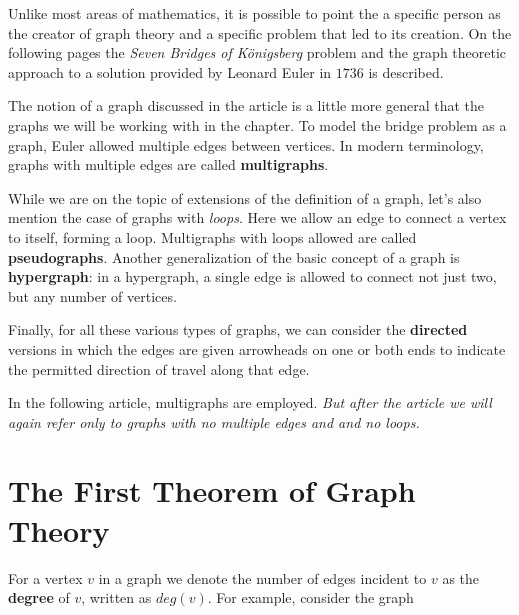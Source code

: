 Unlike most areas of mathematics, it is possible to point the a specific person as the creator of graph theory and a specific problem that  led to its creation. On the following pages  the {\it Seven Bridges of K\"onigsberg} problem  and the graph theoretic approach to a solution provided by Leonard Euler in $1736$ is described. 

The notion of a graph discussed in the article is a little more general that the graphs we will be working with in the chapter. To model the bridge problem as a graph, Euler allowed multiple edges between vertices. In modern terminology, graphs with multiple edges are called {\bfseries multigraphs}.   

While we are on the topic of extensions of the definition of a graph, let's also mention the 
case of graphs with {\it loops}. Here we allow an edge to connect a vertex to itself, forming a 
loop. Multigraphs with loops allowed are called {\bfseries pseudographs}. Another generalization
of the basic concept of a graph is {\bf hypergraph}: in a hypergraph, a single edge is  allowed to
connect not just two, but any number of vertices. 

Finally, for all these various types of graphs, we can consider the {\bfseries directed} versions in which the edges are given arrowheads on one or both ends to indicate the permitted direction of travel along that edge. 

In the following article, multigraphs are employed. {\it But after the article we will again refer only to graphs with no multiple edges and and no loops.}





\section{The First Theorem of Graph Theory}

For a vertex
$v$ in a graph  we denote the number of edges incident to $v$ as the {\bfseries {degree}}
of $v$, written as $deg(v)$. For example, consider the graph

\begin{center}
\end{center}

